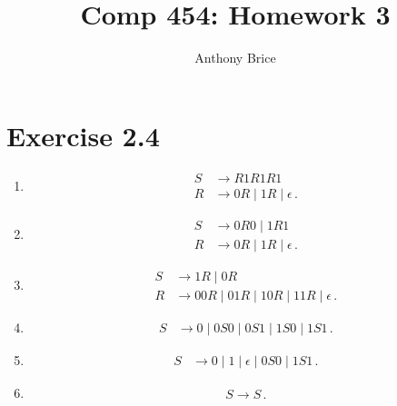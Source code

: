 \documentclass{abrice}
\title{Comp 454: Homework 3}
\author{Anthony Brice}
\begin{document}
\maketitle

\section{Exercise 2.4}

\begin{enumerate}[label=\textbf{\alph*)}]
\item
  \begin{align*}
    S &\rightarrow R1R1R1 \\
    R &\rightarrow 0R \mid 1R \mid \epsilon\, .
  \end{align*}
\item
  \begin{align*}
    S &\rightarrow 0R0 \mid 1R1 \\
    R &\rightarrow 0R \mid 1R \mid \epsilon \, .
  \end{align*}
\item
  \begin{align*}
    S &\rightarrow 1R \mid 0R \\
    R &\rightarrow 00R \mid 01R \mid 10R \mid 11R \mid \epsilon\, .
  \end{align*}
\item
  \begin{align*}
    S &\rightarrow 0 \mid 0S0 \mid 0S1 \mid 1S0 \mid 1S1\, .
  \end{align*}
\item
  \begin{align*}
    S &\rightarrow 0 \mid 1 \mid \epsilon \mid 0S0 \mid 1S1\, .
  \end{align*}
\item
  \begin{align*}
    S \rightarrow S\, .
  \end{align*} 
\end{enumerate}
\end{document}
